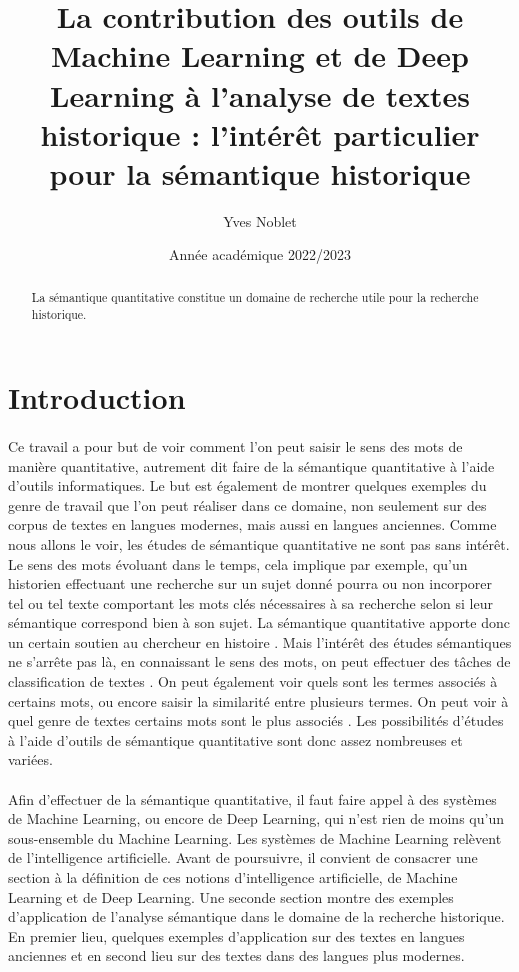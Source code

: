 \documentclass{article}
\title{La contribution des outils de Machine Learning et de Deep Learning à l’analyse de textes historique : l'intérêt particulier pour la sémantique historique}
\author{Yves Noblet}
\date{Année académique 2022/2023}
\begin{document}
\maketitle
\begin{abstract}
    La sémantique quantitative constitue un domaine de recherche utile pour la recherche historique. 
\end{abstract}
\section{Introduction}
\paragraph{}
Ce travail a pour but de voir comment l’on peut saisir le sens des mots de manière quantitative, autrement dit faire de la sémantique quantitative à l’aide d’outils informatiques. Le but est également de montrer quelques exemples du genre de travail que l’on peut réaliser dans ce domaine, non seulement sur des corpus de textes en langues modernes, mais aussi en langues anciennes. Comme nous allons le voir, les études de sémantique quantitative ne sont pas sans intérêt. Le sens des mots évoluant dans le temps, cela implique par exemple, qu’un historien effectuant une recherche sur un sujet donné pourra ou non incorporer tel ou tel texte comportant les mots clés nécessaires à sa recherche selon si leur sémantique correspond bien à son sujet. La sémantique quantitative apporte donc un certain soutien au chercheur en histoire \cite{liebeskind2020deep}. Mais l’intérêt des études sémantiques ne s’arrête pas là, en connaissant le sens des mots, on peut effectuer des tâches de classification de textes \cite{liebeskind2020deep}. On peut également voir quels sont les termes associés à certains mots, ou encore saisir la similarité entre plusieurs termes. On peut voir à quel genre de textes certains mots sont le plus associés \cite{perrone2019gasc}. Les possibilités d’études à l’aide d’outils de sémantique quantitative sont donc assez nombreuses et variées. 
\paragraph{}
Afin d’effectuer de la sémantique quantitative, il faut faire appel à des systèmes de Machine Learning, ou encore de Deep Learning, qui n’est rien de moins qu’un sous-ensemble du Machine Learning. Les systèmes de Machine Learning relèvent de l’intelligence artificielle. Avant de poursuivre, il convient de consacrer une section à la définition de ces notions d’intelligence artificielle, de Machine Learning et de Deep Learning. Une seconde section montre des exemples d’application de l’analyse sémantique dans le domaine de la recherche historique. En premier lieu, quelques exemples d’application sur des textes en langues anciennes et en second lieu sur des textes dans des langues plus modernes. 
\end{document}
